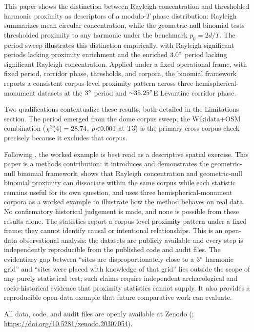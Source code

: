 \documentclass[12pt,a4paper]{article}
\newcommand{\degr}{\ifmmode^\circ\else\textdegree{}\fi}
\begin{document}
This paper shows the distinction between Rayleigh concentration
and thresholded harmonic proximity as descriptors of a modulo-$T$ phase
distribution: Rayleigh summarizes mean circular concentration, while
the geometric-null binomial tests thresholded proximity to any
harmonic under the benchmark $p_0 = 2d/T$. The period sweep illustrates
this distinction empirically, with Rayleigh-significant periods lacking
proximity enrichment and the enriched $3.0\degr$ period lacking
significant Rayleigh concentration. Applied under a fixed operational
frame, with fixed period, corridor phase, thresholds, and corpora, the
binomial framework reports a consistent corpus-level proximity
pattern across three hemispherical-monument datasets at the
$3\degr$ period and ${\sim}35.25\degr$E Levantine corridor phase.

Two qualifications contextualize these results, both detailed in the
Limitations section. The period emerged from the dome corpus sweep;
the Wikidata+OSM combination ($\chi^2(4) = 28.74{}$,
$p {<}0.001{}$ at T3) is the primary cross-corpus check
precisely because it excludes that corpus.

Following \citet{silva2020statistical}, the worked example is best read
as a descriptive spatial exercise. This paper is a methods contribution:
it introduces and demonstrates the geometric-null binomial framework, shows
that Rayleigh concentration and geometric-null binomial proximity
can dissociate within the same corpus while each statistic remains
useful for its own question, and uses three hemispherical-monument corpora as a worked example to
illustrate how the method behaves on real data. No confirmatory
historical judgement is made, and none is possible from these results
alone. The statistics report a corpus-level proximity pattern under a
fixed frame; they cannot identify causal or intentional relationships.
This is an open-data observational analysis: the datasets are publicly
available and every step is independently reproducible from the published
code and audit files. The evidentiary gap between ``sites are
disproportionately close to a $3\degr$ harmonic grid'' and ``sites were
placed with knowledge of that grid'' lies outside the scope of any
purely statistical test; such claims require independent archaeological
and socio-historical evidence that proximity statistics cannot supply.
It also provides a reproducible open-data
example that future comparative work can evaluate.

All data, code, and audit files are openly available at Zenodo
(\citealt{tenenbaum2026audit};
\url{https://doi.org/10.5281/zenodo.20307054}).
\end{document}
